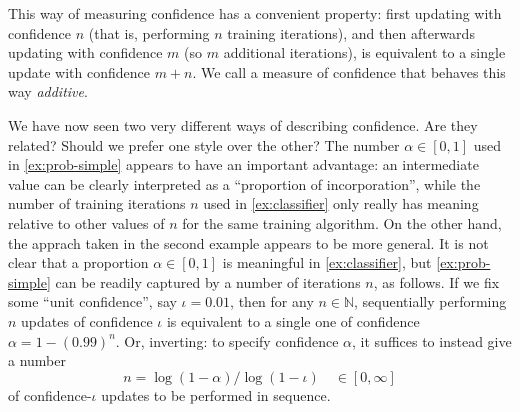 \documentclass{uai2023}
\theoremstyle{plain}
\theoremstyle{definition}
\newcommand\commentout[1]{}
\begin{document}
\begin{example}
This way of measuring confidence has a convenient property:
first updating with confidence $n$ (that is, performing $n$ training
iterations), 
	and then afterwards updating with confidence $m$ (so $m$ additional iterations),
	is equivalent to a single update with confidence $m+n$.
	We call a measure of confidence that behaves this way \emph{additive}.
\end{example}

We have now seen two very different ways of describing confidence. 
Are they related? 
Should we prefer one style over the other?
The number $\alpha \in [0,1]$ used in \cref{ex:prob-simple}
appears to have an important advantage: an intermediate value can be clearly interpreted as a ``proportion of incorporation'', while the number of training iterations $n$ used in
\cref{ex:classifier} only really has meaning relative to
other values of $n$ for the same training algorithm.
On the other hand,
the apprach taken in the second example
appears to be more general. 
It is not clear that a proportion $\alpha \in [0,1]$ 
is meaningful in \cref{ex:classifier},
but \cref{ex:prob-simple} can be
readily captured by a number of iterations 
$n$, as follows.
If we fix some ``unit confidence'', say $\iota=0.01$,
then for any $n \in \mathbb N$,
sequentially performing $n$ updates of confidence $\iota$ is 
equivalent to a single one of confidence $\alpha= 1-(0.99)^n$.
Or, inverting:
to specify confidence $\alpha$, it suffices to 
instead give a number
\begin{equation} \label{eq:loglogiota}
 	n = \log (1 - \alpha ) / \log(1-\iota) 
	\quad\in[0,\infty]
\end{equation}
of confidence-$\iota$ updates to be performed in sequence.
\commentout{
	Thus, in contexts where a proportion of incorporation $\alpha\in[0,1]$ is meaningful,
a number of iterations $n$ is meaningful as well, provided the unit
	$\iota$ is understood.
}
\end{document}
